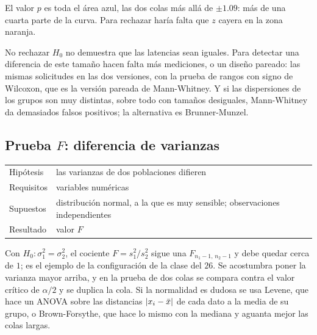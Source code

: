 \documentclass[11pt,letterpaper]{article}
\begin{document}
El valor $p$ es toda el área azul, las dos colas más allá de
$\pm 1.09$: más de una cuarta parte de la curva. Para rechazar haría
falta que $z$ cayera en la zona naranja.

\begin{ojo}
    No rechazar $H_0$ no demuestra que las latencias sean iguales. Para
    detectar una diferencia de este tamaño hacen falta más mediciones,
    o un diseño pareado: las mismas solicitudes en las dos versiones,
    con la prueba de rangos con signo de Wilcoxon, que es la versión
    pareada de Mann-Whitney. Y si las dispersiones de los grupos son
    muy distintas, sobre todo con tamaños desiguales, Mann-Whitney da
    demasiados falsos positivos; la alternativa es Brunner-Munzel.
\end{ojo}


\subsection*{Prueba $F$: diferencia de varianzas}

\begin{center}
\small
\begin{tabular}{l>{\raggedright\arraybackslash}p{10.5cm}}
    \toprule
    Hipótesis & las varianzas de dos poblaciones difieren \\
    Requisitos & variables numéricas \\
    Supuestos & distribución normal, a la que es muy sensible;
                observaciones independientes \\
    Resultado & valor $F$ \\
    \bottomrule
\end{tabular}
\end{center}

Con $H_0\colon \sigma_1^2 = \sigma_2^2$, el cociente $F = s_1^2 / s_2^2$
sigue una $F_{n_1 - 1,\, n_2 - 1}$ y debe quedar cerca de $1$; es el
ejemplo de la configuración de la clase del $26$. Se acostumbra poner
la varianza mayor arriba, y en la prueba de dos colas se compara contra
el valor crítico de $\alpha / 2$ y se duplica la cola. Si la
normalidad es dudosa se usa Levene, que hace un ANOVA sobre las
distancias $\left\lvert x_i - \bar{x} \right\rvert$ de cada dato a la media de su grupo,
o Brown-Forsythe, que hace lo mismo con la mediana y aguanta mejor las
colas largas.
\end{document}

